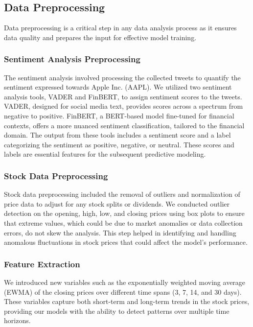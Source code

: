 \documentclass[11pt,a4paper]{article}
\begin{document}
\subsection{Data Preprocessing}
Data preprocessing is a critical step in any data analysis process as it ensures data quality and prepares the input for effective model training.

\subsubsection{Sentiment Analysis Preprocessing}
The sentiment analysis involved processing the collected tweets to quantify the sentiment expressed towards Apple Inc. (AAPL). We utilized two sentiment analysis tools, VADER and FinBERT, to assign sentiment scores to the tweets. VADER, designed for social media text, provides scores across a spectrum from negative to positive. FinBERT, a BERT-based model fine-tuned for financial contexts, offers a more nuanced sentiment classification, tailored to the financial domain. The output from these tools includes a sentiment score and a label categorizing the sentiment as positive, negative, or neutral. These scores and labels are essential features for the subsequent predictive modeling.

\subsubsection{Stock Data Preprocessing}
Stock data preprocessing included the removal of outliers and normalization of price data to adjust for any stock splits or dividends. We conducted outlier detection on the opening, high, low, and closing prices using box plots to ensure that extreme values, which could be due to market anomalies or data collection errors, do not skew the analysis. This step helped in identifying and handling anomalous fluctuations in stock prices that could affect the model's performance.


\subsubsection{Feature Extraction}
We introduced new variables such as the exponentially weighted moving average (EWMA) of the closing prices over different time spans (3, 7, 14, and 30 days). These variables capture both short-term and long-term trends in the stock prices, providing our models with the ability to detect patterns over multiple time horizons.
\end{document}

